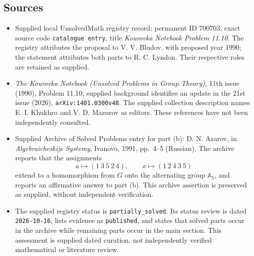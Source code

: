 \documentclass[11pt]{article}
\begin{document}
\subsection{Sources}
\begin{itemize}
\item Supplied local UnsolvedMath registry record: permanent ID \(700703\), exact source code \texttt{catalogue entry}, title \emph{Kourovka Notebook Problem 11.10}. The registry attributes the proposal to V. V. Bludov, with proposed year 1990; the statement attributes both parts to R. C. Lyndon. Their respective roles are retained as supplied.
\item \emph{The Kourovka Notebook (Unsolved Problems in Group Theory)}, 11th issue (1990), Problem 11.10; supplied background identifies an update in the 21st issue (2026), \texttt{arXiv:1401.0300v48}. The supplied collection description names E. I. Khukhro and V. D. Mazurov as editors. These references have not been independently consulted.
\item Supplied Archive of Solved Problems entry for part (b): D. N. Azarov, in \emph{Algebraicheskije Systemy}, Ivanovo, 1991, pp.\ 4--5 (Russian). The archive reports that the assignments
\[
a\longmapsto(1\ 3\ 5\ 2\ 4),\qquad x\longmapsto(1\ 2\ 4\ 3\ 5)
\]
extend to a homomorphism from \(G\) onto the alternating group \(\mathbb{A}_5\), and reports an affirmative answer to part (b). This archive assertion is preserved as supplied, without independent verification.
\item The supplied registry status is \texttt{partially\_solved}. Its status review is dated \texttt{2026-10-16}, lists evidence as \texttt{published}, and states that solved parts occur in the archive while remaining parts occur in the main section. This assessment is supplied dated curation, not independently verified mathematical or literature review.
\end{itemize}
\end{document}

